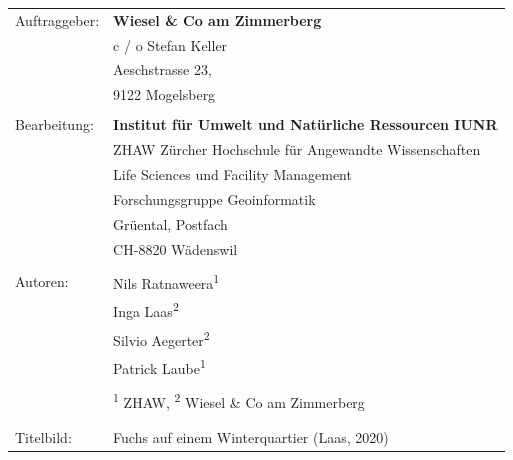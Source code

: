 \documentclass[
  oneside]{scrbook}
\begin{document}
\begin{titlepage}
\begin{flushleft}
\begin{minipage}{21cm}
\begin{tabular}{ll}
Auftraggeber: & \textbf{Wiesel \& Co am Zimmerberg}                         \\
              & c / o Stefan Keller                                         \\
              & Aeschstrasse 23,                                            \\
              & 9122 Mogelsberg                                             \\
              &                                                             \\
Bearbeitung:  & \textbf{Institut für Umwelt und Natürliche Ressourcen IUNR} \\
              & ZHAW Zürcher Hochschule für Angewandte Wissenschaften       \\
              & Life Sciences und Facility Management                       \\
              & Forschungsgruppe Geoinformatik                              \\
              & Grüental, Postfach                                          \\
              & CH-8820 Wädenswil                                           \\
              &                                                             \\
Autoren:      & Nils Ratnaweera\textsuperscript{1}                         \\
              & Inga Laas\textsuperscript{2}                              \\
              & Silvio Aegerter\textsuperscript{2}                        \\
              & Patrick Laube\textsuperscript{1}                           \\
              &                                                             \\
              & \textsuperscript{1} ZHAW, \textsuperscript{2} Wiesel \& Co am Zimmerberg \\
              &                                                             \\
              &                                                             \\
Titelbild:    & Fuchs auf einem Winterquartier (Laas, 2020)                
\end{tabular}
\end{minipage}


\end{flushleft}

\end{titlepage}
\makeatother
\end{document}
